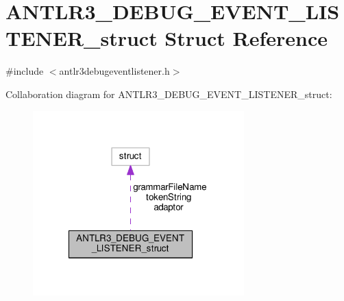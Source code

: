 \hypertarget{struct_a_n_t_l_r3___d_e_b_u_g___e_v_e_n_t___l_i_s_t_e_n_e_r__struct}{\section{A\-N\-T\-L\-R3\-\_\-\-D\-E\-B\-U\-G\-\_\-\-E\-V\-E\-N\-T\-\_\-\-L\-I\-S\-T\-E\-N\-E\-R\-\_\-struct Struct Reference}
\label{struct_a_n_t_l_r3___d_e_b_u_g___e_v_e_n_t___l_i_s_t_e_n_e_r__struct}
}


{\ttfamily \#include $<$antlr3debugeventlistener.\-h$>$}



Collaboration diagram for A\-N\-T\-L\-R3\-\_\-\-D\-E\-B\-U\-G\-\_\-\-E\-V\-E\-N\-T\-\_\-\-L\-I\-S\-T\-E\-N\-E\-R\-\_\-struct\-:
\nopagebreak
\begin{figure}[H]
\begin{center}
\leavevmode
\includegraphics[width=231pt]{struct_a_n_t_l_r3___d_e_b_u_g___e_v_e_n_t___l_i_s_t_e_n_e_r__struct__coll__graph}
\end{center}
\end{figure}
